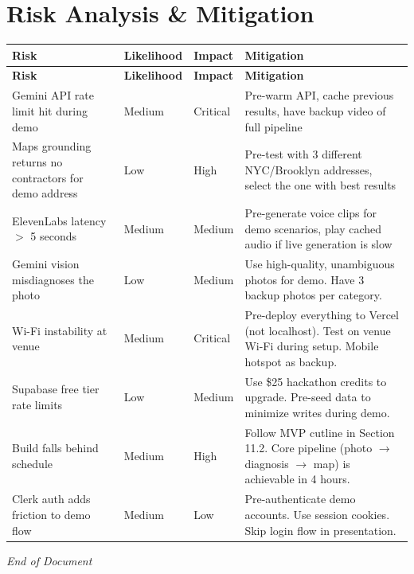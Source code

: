 \documentclass[12pt,a4paper]{article}
\begin{document}
\section{Risk Analysis \& Mitigation}

\begin{longtable}{L{3cm} L{2cm} L{1.5cm} L{6.5cm}}
\toprule
\textbf{Risk} & \textbf{Likelihood} & \textbf{Impact} & \textbf{Mitigation} \\
\midrule
\endfirsthead
\toprule
\textbf{Risk} & \textbf{Likelihood} & \textbf{Impact} & \textbf{Mitigation} \\
\midrule
\endhead
\bottomrule
\endfoot
Gemini API rate limit hit during demo & Medium & Critical & Pre-warm API, cache previous results, have backup video of full pipeline \\
\midrule
Maps grounding returns no contractors for demo address & Low & High & Pre-test with 3 different NYC/Brooklyn addresses, select the one with best results \\
\midrule
ElevenLabs latency $>$ 5 seconds & Medium & Medium & Pre-generate voice clips for demo scenarios, play cached audio if live generation is slow \\
\midrule
Gemini vision misdiagnoses the photo & Low & Medium & Use high-quality, unambiguous photos for demo. Have 3 backup photos per category. \\
\midrule
Wi-Fi instability at venue & Medium & Critical & Pre-deploy everything to Vercel (not localhost). Test on venue Wi-Fi during setup. Mobile hotspot as backup. \\
\midrule
Supabase free tier rate limits & Low & Medium & Use \$25 hackathon credits to upgrade. Pre-seed data to minimize writes during demo. \\
\midrule
Build falls behind schedule & Medium & High & Follow MVP cutline in Section 11.2. Core pipeline (photo $\rightarrow$ diagnosis $\rightarrow$ map) is achievable in 4 hours. \\
\midrule
Clerk auth adds friction to demo flow & Medium & Low & Pre-authenticate demo accounts. Use session cookies. Skip login flow in presentation. \\
\end{longtable}

\vspace{1cm}
\begin{center}
    \textit{End of Document}
\end{center}
\end{document}
